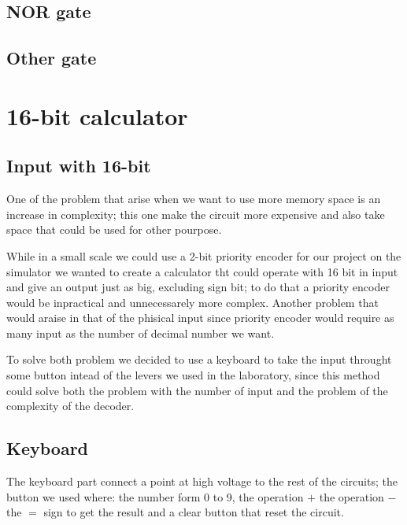 \documentclass{article}
\begin{document}
\subsection{NOR gate}

\subsection{Other gate}

%
%
%
%
\section{16-bit calculator}



\subsection{Input with 16-bit}

One of the problem that arise when we want to use more memory space is an increase in complexity; this one make the circuit more expensive and also take space that could be used for other pourpose. 

While in a small scale we could use a 2-bit priority encoder for our project on the simulator we wanted to create a calculator tht could operate with 16 bit in input and give an output just as big, excluding sign bit; to do that a priority encoder would be inpractical and unnecessarely more complex.
Another problem that would araise in that of the phisical input since  priority encoder would require as many input as the number of decimal number we want.

\vspace{3mm}

To solve both problem we decided to use a keyboard to take the input throught some button intead of the levers we used in the laboratory, since this method could solve both the problem with the number of input and the problem of the complexity of the decoder.



\subsection{Keyboard}
The keyboard part connect a point at high voltage to the rest of the circuits; the button we used where: the number form 0 to 9, the operation $+$ the operation $-$ the $=$ sign to get the result and a clear button that reset the circuit.

\end{document}
